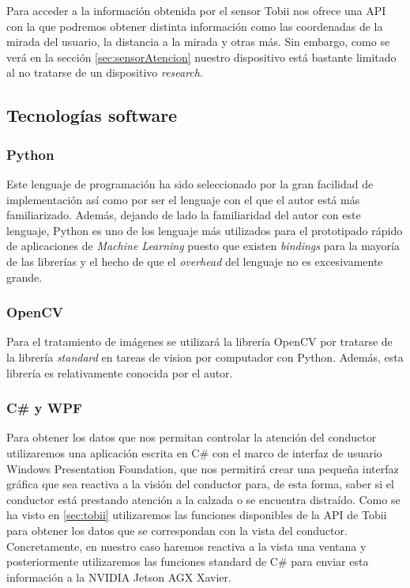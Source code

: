 Para acceder a la información obtenida por el sensor Tobii nos ofrece una API con la que podremos obtener distinta información como las coordenadas de la mirada del usuario, la distancia a la mirada y otras más. Sin embargo, como se verá en la sección \ref{sec:sensorAtencion} nuestro dispositivo está bastante limitado al no tratarse de un dispositivo \textit{research}.



\clearpage
\subsection{Tecnologías software}
\subsubsection{Python}

Este lenguaje de programación ha sido seleccionado por la gran facilidad de implementación así como por ser el lenguaje con el que el autor está más familiarizado. Además, dejando de lado la familiaridad del autor con este lenguaje, Python es uno de los lenguaje más utilizados para el prototipado rápido de aplicaciones de \textit{Machine Learning} puesto que existen \textit{bindings} para la mayoría de las librerías y el hecho de que el \textit{overhead} del lenguaje no es excesivamente grande.

\subsubsection{OpenCV}
Para el tratamiento de imágenes se utilizará la librería OpenCV por tratarse de la librería \textit{standard} en tareas de vision por computador con Python. Además, esta librería es relativamente conocida por el autor.


\subsubsection{C\# y WPF}
Para obtener los datos que nos permitan controlar la atención del conductor utilizaremos una aplicación escrita en C\# con el marco de interfaz de usuario Windows Presentation Foundation, que nos permitirá crear una pequeña interfaz gráfica que sea reactiva a la visión del conductor para, de esta forma, saber si el conductor está prestando atención a la calzada o se encuentra distraído.
Como se ha visto en \ref{sec:tobii} utilizaremos las funciones disponibles de la API de Tobii para obtener los datos que se correspondan con la vista del conductor. Concretamente, en nuestro caso haremos reactiva a la vista una ventana y posteriormente utilizaremos las funciones standard de C\# para enviar esta información a la NVIDIA Jetson AGX Xavier.

